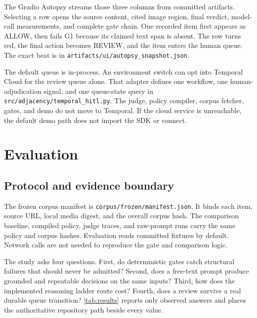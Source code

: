 \documentclass{article}
\newcommand{\artifact}[1]{\nolinkurl{#1}}
\begin{document}
The Gradio Autopsy streams those three columns from committed artifacts. Selecting a row opens the
source content, cited image region, final verdict, model-call measurements, and complete gate chain.
One recorded item first appears as ALLOW, then fails G1 because its claimed text span is absent. The
row turns red, the final action becomes REVIEW, and the item enters the human queue. The exact beat is
in \artifact{artifacts/ui/autopsy_snapshot.json}.

The default queue is in-process. An environment switch can opt into Temporal Cloud for the review
queue alone. That adapter defines one workflow, one human-adjudication signal, and one queue-state
query in \artifact{src/adjacency/temporal_hitl.py}. The judge, policy compiler, corpus fetcher, gates,
and demo do not move to Temporal. If the cloud service is unreachable, the default demo path does not
import the SDK or connect.

\section{Evaluation}
\label{sec:experiments}

\subsection{Protocol and evidence boundary}

The frozen corpus manifest is \artifact{corpus/frozen/manifest.json}. It binds each item, source URL,
local media digest, and the overall corpus hash. The comparison baseline, compiled policy, judge
traces, and raw-prompt runs carry the same policy and corpus hashes. Evaluation reads committed
fixtures by default. Network calls are not needed to reproduce the gate and comparison logic.

The study asks four questions. First, do deterministic gates catch structural failures that should
never be admitted? Second, does a free-text prompt produce grounded and repeatable decisions on the
same inputs? Third, how does the implemented reasoning ladder route cost? Fourth, does a review
survive a real durable queue transition? \cref{tab:results} reports only observed answers and places
the authoritative repository path beside every value.
\end{document}
